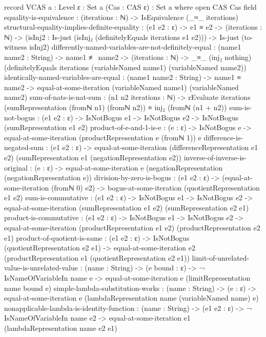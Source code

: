 \documentclass{report}
\begin{document}
\begin{code}
record VCAS {a : Level} {ε : Set a} (Cas : CAS ε) : Set a where
  open CAS Cas
  field
    equality-is-equivalence : (iterations : ℕ) -> IsEquivalence (_≈_ iterations)
    structural-equality-implies-definite-equality :
      (e1 e2 : ε) ->
      e1 ≡ e2 ->
      (iterations : ℕ) ->
      (isInj2 : Is-just (isInj₂ (definitelyEquals iterations e1 e2))) ->
      Is-just (to-witness isInj2)
    differently-named-variables-are-not-definitely-equal :
      (name1 name2 : String) ->
      name1 ≢ name2 ->
      (iterations : ℕ) ->
      _≡_ (inj₂ nothing)
          (definitelyEquals iterations
                            (variableNamed name1)
                            (variableNamed name2))
    identically-named-variables-are-equal :
      (name1 name2 : String) ->
      name1 ≡ name2 ->
      equal-at-some-iteration (variableNamed name1) (variableNamed name2)
    sum-of-nats-is-nat-sum :
      (n1 n2 iterations : ℕ) ->
      rEvaluate iterations (sumRepresentation (fromℕ n1) (fromℕ n2)) ≡
        inj₂ (fromℕ (n1 + n2))
    sum-is-not-bogus :
      (e1 e2 : ε) ->
      IsNotBogus e1 ->
      IsNotBogus e2 ->
      IsNotBogus (sumRepresentation e1 e2)
    product-of-e-and-1-is-e :
      (e : ε) ->
      IsNotBogus e ->
      equal-at-some-iteration (productRepresentation e (fromℕ 1)) e
    difference-is-negated-sum :
      (e1 e2 : ε) ->
      equal-at-some-iteration (differenceRepresentation e1 e2)
                              (sumRepresentation e1 (negationRepresentation e2))
    inverse-of-inverse-is-original :
      (e : ε) ->
      equal-at-some-iteration e (negationRepresentation (negationRepresentation e))
    division-by-zero-is-bogus :
      (e1 e2 : ε) ->
      (equal-at-some-iteration (fromℕ 0) e2) ->
      bogus-at-some-iteration (quotientRepresentation e1 e2)
    sum-is-commutative :
      (e1 e2 : ε) ->
      IsNotBogus e1 ->
      IsNotBogus e2 ->
      equal-at-some-iteration (sumRepresentation e1 e2)
                              (sumRepresentation e2 e1)
    product-is-commutative :
      (e1 e2 : ε) ->
      IsNotBogus e1 ->
      IsNotBogus e2 ->
      equal-at-some-iteration (productRepresentation e1 e2)
                              (productRepresentation e2 e1)
    product-of-quotient-is-same :
      (e1 e2 : ε) ->
      IsNotBogus (quotientRepresentation e2 e1) ->
      equal-at-some-iteration e2 (productRepresentation e1 (quotientRepresentation e2 e1))
    limit-of-unrelated-value-is-unrelated-value :
      (name : String) ->
      (e bound : ε) ->
      ¬ IsNameOfVariableIn name e ->
      equal-at-some-iteration e (limitRepresentation name bound e)
    simple-lambda-substitution-works :
      (name : String) ->
      (e : ε) ->
      equal-at-some-iteration e (lambdaRepresentation name (variableNamed name) e)
    nonapplicable-lambda-is-identity-function :
      (name : String) ->
      (e1 e2 : ε) ->
      ¬ IsNameOfVariableIn name e2 ->
      equal-at-some-iteration e1 (lambdaRepresentation name e2 e1)
\end{code}
\end{document}
